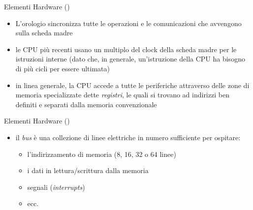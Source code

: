 \begin{slide}{{Elementi Hardware ()}}
{

	\begin{itemize}
	\setlength{\itemsep}{10mm}

		\item L'orologio sincronizza tutte le operazioni
			  e le comunicazioni che avvengono sulla
			  scheda madre

		\item le CPU pi\`u recenti usano un multiplo del clock della scheda madre per
			  le istruzioni interne (dato che, in generale,
			  un'istruzione della CPU ha bisogno di pi\`u cicli per essere
			  ultimata)

		\item in linea generale, la CPU accede a tutte le periferiche
		      attraverso delle zone di memoria specializzate
			  dette \emph{registri}, le quali si trovano ad indirizzi ben definiti
			  e separati dalla memoria convenzionale

	\end{itemize}
}
\end{slide}

\begin{slide}{{Elementi Hardware ()}}
{

	\begin{itemize}

		\item il \emph{bus} \`e una collezione di linee elettriche
              in numero sufficiente per ospitare:

			  \vspace{8mm}
			  \begin{itemize}
			  \setlength{\itemsep}{8mm}

				\item l'indirizzamento di memoria (8, 16, 32 o 64 linee)

				\item i dati in lettura/scrittura dalla memoria

				\item segnali (\emph{interrupts})

				\item ecc.

			  \end{itemize}

	\end{itemize}
}
\end{slide}

